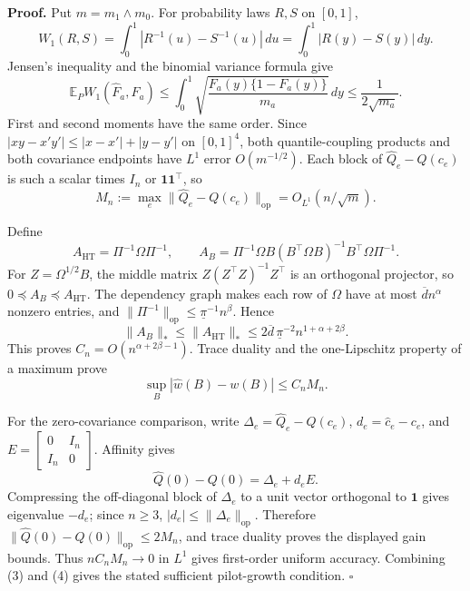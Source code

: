 \textbf{Proof.}
Put \(m=m_1\wedge m_0\).  For probability laws \(R,S\) on \([0,1]\),
\[
W_1(R,S)=\int_0^1|R^{-1}(u)-S^{-1}(u)|\,du
=\int_0^1|R(y)-S(y)|\,dy.
\tag{1}
\]
Jensen's inequality and the binomial variance formula give
\[
\mathbb E_PW_1(\widehat F_a,F_a)
\le\int_0^1\sqrt{\frac{F_a(y)\{1-F_a(y)\}}{m_a}}\,dy
\le\frac1{2\sqrt{m_a}}.
\tag{2}
\]
First and second moments have the same order.  Since \(|xy-x'y'|\le|x-x'|+|y-y'|\) on \([0,1]^4\), both quantile-coupling products and both covariance endpoints have \(L^1\) error \(O(m^{-1/2})\).  Each block of \(\widehat Q_e-Q(c_e)\) is such a scalar times \(I_n\) or \(\mathbf1\mathbf1^{\top}\), so
\[
M_n:=\max_e\lVert\widehat Q_e-Q(c_e)\rVert_{\mathrm{op}}
=O_{L^1}(n/\sqrt m).
\tag{3}
\]

Define
\[
A_{\mathrm{HT}}=\Pi^{-1}\Omega\Pi^{-1},
\qquad
A_B=\Pi^{-1}\Omega B(B^{\top}\Omega B)^{-1}B^{\top}\Omega\Pi^{-1}.
\]
For \(Z=\Omega^{1/2}B\), the middle matrix \(Z(Z^{\top}Z)^{-1}Z^{\top}\) is an orthogonal projector, so \(0\preceq A_B\preceq A_{\mathrm{HT}}\).  The dependency graph makes each row of \(\Omega\) have at most \(\overline d n^\alpha\) nonzero entries, and \(\lVert\Pi^{-1}\rVert_{\mathrm{op}}\le\underline\pi^{-1}n^\beta\).  Hence
\[
\lVert A_B\rVert_*\le\lVert A_{\mathrm{HT}}\rVert_*
\le2\overline d\,\underline\pi^{-2}n^{1+\alpha+2\beta}.
\tag{4}
\]
This proves \(C_n=O(n^{\alpha+2\beta-1})\).  Trace duality and the one-Lipschitz property of a maximum prove
\[
\sup_B|\widehat w(B)-w(B)|\le C_nM_n.
\tag{5}
\]

For the zero-covariance comparison, write \(\Delta_e=\widehat Q_e-Q(c_e)\), \(d_e=\widehat c_e-c_e\), and \(E=\begin{bmatrix}0&I_n\\I_n&0\end{bmatrix}\).  Affinity gives
\[
\widehat Q(0)-Q(0)=\Delta_e+d_eE.
\tag{6}
\]
Compressing the off-diagonal block of \(\Delta_e\) to a unit vector orthogonal to \(\mathbf1\) gives eigenvalue \(-d_e\); since \(n\ge3\), \(|d_e|\le\lVert\Delta_e\rVert_{\mathrm{op}}\).  Therefore \(\lVert\widehat Q(0)-Q(0)\rVert_{\mathrm{op}}\le2M_n\), and trace duality proves the displayed gain bounds.  Thus \(nC_nM_n\to0\) in \(L^1\) gives first-order uniform accuracy.  Combining (3) and (4) gives the stated sufficient pilot-growth condition. \(\square\)